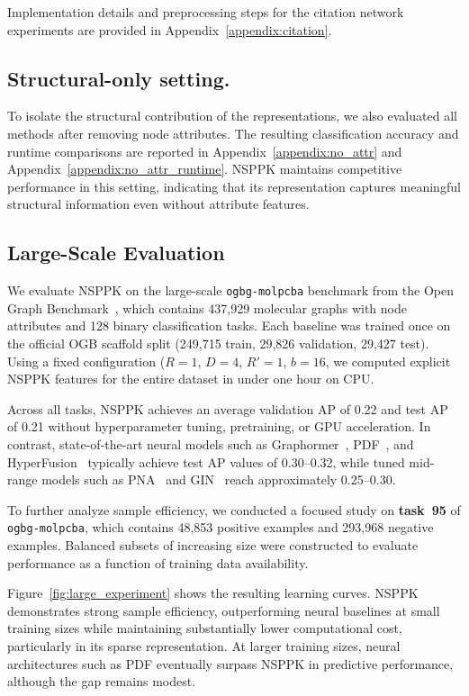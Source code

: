 Implementation details and preprocessing steps for the citation network
experiments are provided in Appendix~\ref{appendix:citation}.
\subsection{Structural-only setting.}
To isolate the structural contribution of the representations, we also
evaluated all methods after removing node attributes. The resulting
classification accuracy and runtime comparisons are reported in
Appendix~\ref{appendix:no_attr} and
Appendix~\ref{appendix:no_attr_runtime}. NSPPK maintains competitive
performance in this setting, indicating that its representation captures
meaningful structural information even without attribute features.
\subsection{Large-Scale Evaluation}
\label{sec:large}

We evaluate NSPPK on the large-scale \texttt{ogbg-molpcba} benchmark from the
Open Graph Benchmark~\citep{hu2020ogb}, which contains 437,929 molecular graphs
with node attributes and 128 binary classification tasks. Each baseline was
trained once on the official OGB scaffold split (249,715 train, 29,826
validation, 29,427 test). Using a fixed configuration
($R=1$, $D=4$, $R'=1$, $b=16$, we computed explicit NSPPK
features for the entire dataset in under one hour on CPU.

Across all tasks, NSPPK achieves an average validation AP of 0.22 and test AP
of 0.21 without hyperparameter tuning, pretraining, or GPU acceleration.
In contrast, state-of-the-art neural models such as
Graphormer~\citep{ying2021transformers},
PDF~\citep{yang2023pdf}, and
HyperFusion~\citep{ye2025hyperfusion}
typically achieve test AP values of 0.30--0.32, while tuned mid-range models
such as PNA~\citep{corso2020pna} and GIN~\citep{xu2019powerful} reach
approximately 0.25--0.30.

To further analyze sample efficiency, we conducted a focused study on
\textbf{task~95} of \texttt{ogbg-molpcba}, which contains 48,853 positive
examples and 293,968 negative examples. Balanced subsets of increasing size
were constructed to evaluate performance as a function of training data
availability.

Figure~\ref{fig:large_experiment} shows the resulting learning curves.
NSPPK demonstrates strong sample efficiency, outperforming neural baselines at
small training sizes while maintaining substantially lower computational cost,
particularly in its sparse representation. At larger training sizes,
neural architectures such as PDF eventually surpass NSPPK in predictive
performance, although the gap remains modest.


